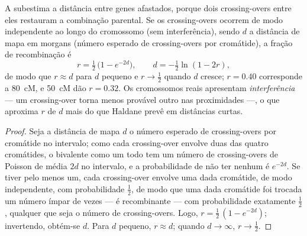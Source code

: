 \begin{theorem}\label{thm:b2:meiosis-heredity:haldane}
A  subestima a distância entre genes
afastados, porque dois crossing-overs entre eles restauram a
combinação parental. Se os crossing-overs ocorrem de modo independente
ao longo do cromossomo (sem interferência), sendo $d$ a distância de
mapa em morgans (número esperado de crossing-overs por cromátide), a
fração de recombinação é
\[
r = \tfrac12\,\bigl(1 - e^{-2d}\bigr), \qquad d = -\tfrac12\ln(1 - 2r),
\]
de modo que $r \approx d$ para $d$ pequeno e $r \to \tfrac12$ quando
$d$ cresce; $r = 0.40$ corresponde a \qty{80}{cM}, e \qty{50}{cM}
dão $r = 0.32$. Os cromossomos reais apresentam \emph{interferência}
--- um crossing-over torna menos provável outro nas proximidades ---, o
que aproxima $r$ de $d$ mais do que Haldane prevê em distâncias
curtas.
\end{theorem}
\begin{proof}
Seja a distância de mapa $d$ o número esperado de crossing-overs por
cromátide no intervalo; como cada crossing-over envolve duas das
quatro cromátides, o bivalente como um todo tem um número de
crossing-overs de Poisson de média $2d$ no intervalo, e a probabilidade
de não ter nenhum é $e^{-2d}$. Se tiver pelo menos um, cada
crossing-over envolve uma dada cromátide, de modo independente, com
probabilidade
$\tfrac12$, de modo que uma dada cromátide foi trocada um número ímpar
de vezes --- é recombinante --- com probabilidade exatamente
$\tfrac12$, qualquer que seja o número de crossing-overs. Logo,
$r = \tfrac12\,(1 -
e^{-2d})$; invertendo, obtém-se $d$. Para $d$ pequeno, $r \approx d$;
quando $d \to \infty$, $r \to \tfrac12$.
\end{proof}

